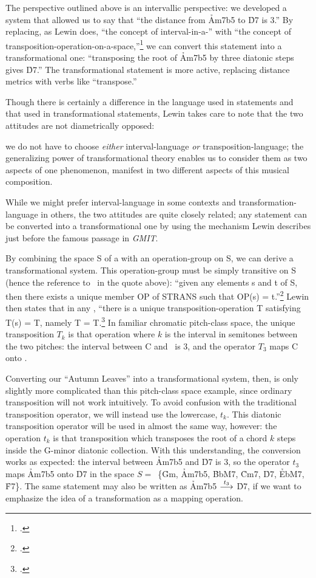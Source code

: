 The \gis{} perspective outlined above is an intervallic perspective: we developed
a system that allowed us to say that “the distance from \h{Am7b5} to \h{D7} is
3.” By replacing, as Lewin does, “the concept of interval-in-a-\gis{}” with “the
concept of transposition-operation-on-a-space,”\footcite[157]{lewin:gmit} we
can convert this \gis{} statement into a transformational one: “transposing the
root of \h{Am7b5} by three diatonic steps gives \h{D7}.” The transformational
statement is more active, replacing distance metrics with verbs like
“transpose.”

Though there is certainly a difference in the language used in \gis{} statements
and that used in transformational statements, Lewin takes care to note that
the two attitudes are not diametrically opposed:
\begin{quoting}
  \singlespacing
  we do not have to choose \emph{either} interval-language \emph{or}
  transposition-language; the generalizing power of transformational theory
  enables us to consider them as two aspects of one phenomenon, manifest in
  two different aspects of this musical composition.
\end{quoting}
While we might prefer interval-language in some contexts and
transformation-language in others, the two attitudes are quite closely
related; any \gis{} statement can be converted into a transformational one by
using the mechanism Lewin describes just before the famous passage in
\emph{GMIT}.

By combining the space S of a \gis{} with an operation-group on S, we can derive
a transformational system. This operation-group must be simply transitive on S
(hence the reference to \strans\ in the quote above): “given any elements s and
t of S, then there exists a unique member OP of STRANS such that OP(s) =
t.”\footcite[157]{lewin:gmit} Lewin then states that in any \gis{}, “there is a
unique transposition-operation T satisfying T(s) = T, namely T =
T.\footcite[157]{lewin:gmit} In familiar chromatic pitch-class
space, the unique transposition $T_k$ is that operation where $k$ is the
interval in semitones between the two pitches: the interval between C and
\Eflat\ is 3, and the operator $T_3$ maps C onto \Eflat.

Converting our “Autumn Leaves” \gis{} into a transformational system, then, is
only slightly more complicated than this pitch-class space example, since
ordinary transposition will not work intuitively. To avoid confusion with the
traditional transposition operator, we will instead use the lowercase,
$t_k$. This diatonic transposition operator will be used in almost
the same way, however: the operation $t_k$ is that transposition which
transposes the root of a chord $k$ steps inside the G-minor diatonic
collection. With this understanding, the conversion works as expected: the
interval between \h{Am7b5} and \h{D7} is 3, so the operator $t_3$ maps
\h{Am7b5} onto \h{D7} in the space \mbox{$S =$ \{\h{Gm},} \h{Am7b5}, \h{BbM7},
\h{Cm7}, \h{D7}, \h{EbM7}, \h{F7}\}. The same statement may also be
written as \h{Am7b5} $\overset{t_3}{\longrightarrow}$ \h{D7}, if we want to emphasize the
idea of a transformation as a mapping operation.

